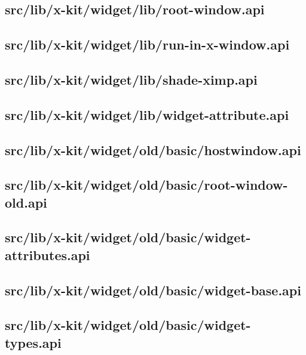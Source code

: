 \subsection{src/lib/x-kit/widget/lib/root-window.api}


\subsection{src/lib/x-kit/widget/lib/run-in-x-window.api}


\subsection{src/lib/x-kit/widget/lib/shade-ximp.api}


\subsection{src/lib/x-kit/widget/lib/widget-attribute.api}


\subsection{src/lib/x-kit/widget/old/basic/hostwindow.api}


\subsection{src/lib/x-kit/widget/old/basic/root-window-old.api}


\subsection{src/lib/x-kit/widget/old/basic/widget-attributes.api}


\subsection{src/lib/x-kit/widget/old/basic/widget-base.api}


\subsection{src/lib/x-kit/widget/old/basic/widget-types.api}


